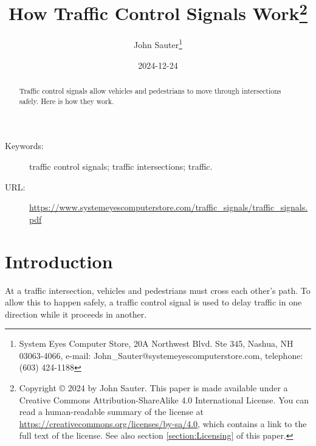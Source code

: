 \documentclass[letterpaper,twoside]{article}
\begin{document}
\title{How Traffic Control Signals Work\footnote{Copyright
    {\copyright} 2024 by John Sauter.
    This paper is made available under a
    Creative Commons Attribution-ShareAlike 4.0 International License.
    You can read a human-readable summary of the license at
    \href{https://creativecommons.org/licenses/by-sa/4.0}{https://creativecommons.org/licenses/by-sa/4.0},
    which contains a link to the full text of the license.
    See also section \ref{section:Licensing} of this paper.}
}
\author{John Sauter\footnote{
    System Eyes Computer Store,
    20A Northwest Blvd.  Ste 345,
    Nashua, NH  03063-4066,
    e-mail: John\_Sauter@systemeyescomputerstore.com,
    telephone: (603) 424-1188}}

\date{2024-12-24}
\maketitle
\begin{abstract}
  Traffic control signals allow vehicles and pedestrians to move through
  intersections safely.  Here is how they work.
\end{abstract}
\begin{description}
\item[Keywords:]traffic control signals; traffic intersections; traffic.
\item[URL:]\href{https://www.systemeyescomputerstore.com/traffic\_signals/traffic\_signalst.pdf}{https://www.systemeyescomputerstore.com/traffic\_signals/traffic\_signals.pdf}
\end{description}
\newpage

\section{Introduction}
At a traffic intersection, vehicles and pedestrians must cross each other's
path.  To allow this to happen safely, a traffic control signal is used to
delay traffic in one direction while it proceeds in another.
\end{document}
